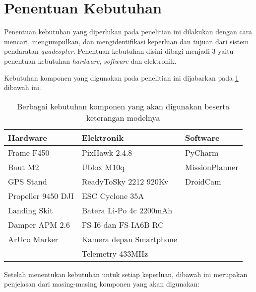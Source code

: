 \section{Penentuan Kebutuhan}
Penentuan kebutuhan yang diperlukan pada penelitian ini dilakukan dengan cara mencari, mengumpulkan, dan mengidentifikasi keperluan dan tujuan dari sistem pendaratan \textit{quadcopter}. Penentuan kebutuhan disini dibagi menjadi 3 yaitu penentuan kebutuhan \textit{hardware}, \textit{software} dan elektronik.

Kebutuhan komponen yang digunakan pada penelitian ini dijabarkan pada \cref{tab:penentuankebutuhan} dibawah ini.

\begin{table}[h]
	\centering
	\caption{Berbagai kebutuhan komponen yang akan digunakan beserta keterangan modelnya}
	\label{tab:penentuankebutuhan}
	\begin{tabular}{|l|l|l|} 
		\hline
		\textbf{Hardware}  & \textbf{Elektronik}     & \textbf{Software}  \\ 
		\hline
		Frame F450         & PixHawk 2.4.8           & PyCharm            \\ 
		\hline
		Baut M2            & Ublox M10q              & MissionPlanner     \\ 
		\hline
		GPS Stand          & ReadyToSky 2212 920Kv   & DroidCam           \\ 
		\hline
		Propeller 9450 DJI & ESC Cyclone 35A         &                    \\ 
		\hline
		Landing Skit       & Batera Li-Po 4c 2200mAh &                    \\ 
		\hline
		Damper APM 2.6     & FS-I6 dan FS-IA6B RC    &                    \\ 
		\hline
		ArUco Marker       & Kamera depan Smartphone &                    \\ 
		\hline
		& Telemetry 433MHz         &                    \\
		\hline
	\end{tabular}
\end{table}

Setelah menentukan kebutuhan untuk setiap keperluan, dibawah ini merupakan penjelasan dari masing-masing komponen yang akan digunakan:

